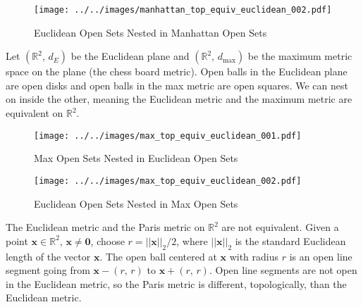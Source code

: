 \documentclass{article}
\theoremstyle{plain}
\theoremstyle{normal}
\newenvironment{example}{%
    \pushQED{\qed}\renewcommand{\qedsymbol}{$\blacksquare$}\examplex%
}{%
    \popQED\endexamplex%
}
\begin{document}
        \begin{figure}
            \centering
            \texttt{[image: ../../images/manhattan\_top\_equiv\_euclidean\_002.pdf]}
            \caption{Euclidean Open Sets Nested in Manhattan Open Sets}
            \label{fig:manhattan_top_equiv_euclidean_002}
        \end{figure}
        \begin{example}
            Let $(\mathbb{R}^{2},\,d_{E})$ be the Euclidean plane and
            $(\mathbb{R}^{2},\,d_{\textrm{max}})$ be the maximum metric space
            on the plane (the chess board metric). Open balls in the Euclidean
            plane are open disks and open balls in the max metric are open
            squares. We can nest on inside the other, meaning the Euclidean
            metric and the maximum metric are equivalent on $\mathbb{R}^{2}$.
        \end{example}
        \begin{figure}
            \centering
            \texttt{[image: ../../images/max\_top\_equiv\_euclidean\_001.pdf]}
            \caption{Max Open Sets Nested in Euclidean Open Sets}
            \label{fig:max_top_equiv_euclidean_001}
        \end{figure}
        \begin{figure}
            \centering
            \texttt{[image: ../../images/max\_top\_equiv\_euclidean\_002.pdf]}
            \caption{Euclidean Open Sets Nested in Max Open Sets}
            \label{fig:max_top_equiv_euclidean_002}
        \end{figure}
        \begin{example}
            The Euclidean metric and the Paris metric on
            $\mathbb{R}^{2}$ are not equivalent. Given a point
            $\mathbf{x}\in\mathbb{R}^{2}$, $\mathbf{x}\ne\mathbf{0}$,
            choose $r=||\mathbf{x}||_{2}/2$, where $||\mathbf{x}||_{2}$ is the
            standard Euclidean length of the vector $\mathbf{x}$. The open
            ball centered at $\mathbf{x}$ with radius $r$ is an open
            line segment going from $\mathbf{x}-(r,\,r)$ to
            $\mathbf{x}+(r,\,r)$. Open line segments are not open in the
            Euclidean metric, so the Paris metric is different, topologically,
            than the Euclidean metric.
        \end{example}
\end{document}

